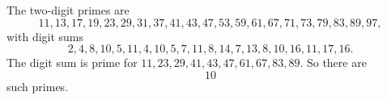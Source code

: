 The two-digit primes are
\[11,13,17,19,23,29,31,37,41,43,47,53,59,61,67,71,73,79,83,89,97,\]
with digit sums
\[2,4,8,10,5,11,4,10,5,7,11,8,14,7,13,8,10,16,11,17,16.\]
The digit sum is prime for $11,23,29,41,43,47,61,67,83,89$. So there are
\[\boxed{10}\]
such primes.
